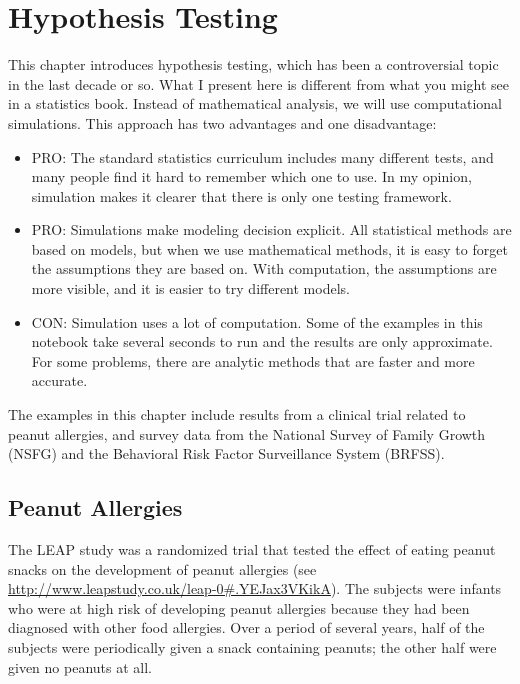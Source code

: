 \hypertarget{hypothesis-testing}{%
\chapter{Hypothesis Testing}\label{hypothesis-testing}}

This chapter introduces hypothesis testing, which has been a
controversial topic in the last decade or so. What I present here is
different from what you might see in a statistics book. Instead of
mathematical analysis, we will use computational simulations. This
approach has two advantages and one disadvantage:

\begin{itemize}
\item
  PRO: The standard statistics curriculum includes many different tests,
  and many people find it hard to remember which one to use. In my
  opinion, simulation makes it clearer that there is only one testing
  framework.
\item
  PRO: Simulations make modeling decision explicit. All statistical
  methods are based on models, but when we use mathematical methods, it
  is easy to forget the assumptions they are based on. With computation,
  the assumptions are more visible, and it is easier to try different
  models.
\item
  CON: Simulation uses a lot of computation. Some of the examples in
  this notebook take several seconds to run and the results are only
  approximate. For some problems, there are analytic methods that are
  faster and more accurate.
\end{itemize}

The examples in this chapter include results from a clinical trial
related to peanut allergies, and survey data from the National Survey of
Family Growth (NSFG) and the Behavioral Risk Factor Surveillance System
(BRFSS).

\hypertarget{peanut-allergies}{%
\section{Peanut Allergies}\label{peanut-allergies}}

The LEAP study was a randomized trial that tested the effect of eating
peanut snacks on the development of peanut allergies (see
\url{http://www.leapstudy.co.uk/leap-0\#.YEJax3VKikA}). The subjects
were infants who were at high risk of developing peanut allergies
because they had been diagnosed with other food allergies. Over a period
of several years, half of the subjects were periodically given a snack
containing peanuts; the other half were given no peanuts at all.

